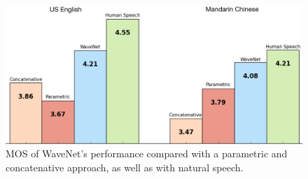 \documentclass[a4paper, oneside, 12pt, english]{article}
\begin{document}
\begin{figure}[h]
	\centering
	\includegraphics[width=.75\linewidth]{images/wavenet_results_chart.png}
	\caption[Figure]{MOS of WaveNet's performance compared with a parametric and concatenative approach, as well as with natural speech.\protect\footnotemark}
	\label{wavenet_results}
\end{figure}


%
\end{document}
